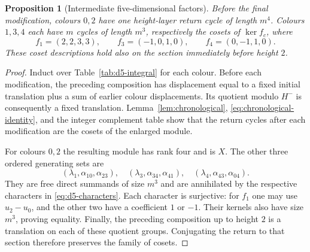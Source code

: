\documentclass[11pt,reqno]{amsart}
\numberwithin{equation}{section}
\newtheorem{proposition}[theorem]{Proposition}
\theoremstyle{definition}
\theoremstyle{remark}
\begin{document}
\begin{proposition}[Intermediate five-dimensional factors]\label{prop:d5-preterminal}
Before the final modification, colours $0,2$ have one height-layer return cycle of
length $m^4$. Colours $1,3,4$ each have $m$ cycles of length $m^3$, respectively
the cosets of $\ker f_c$, where
\begin{equation}\label{eq:d5-characters}
 f_1=(2,2,3,3),\qquad f_3=(-1,0,1,0),\qquad f_4=(0,-1,1,0).
\end{equation}
These coset descriptions hold also on the section immediately before height $2$.
\end{proposition}
\begin{proof}
Induct over Table~\ref{tab:d5-integral} for each colour. Before each
modification, the preceding composition has displacement equal to a fixed
initial translation plus a sum of earlier colour displacements. Its quotient modulo
$H^-$ is consequently a fixed translation. Lemma~\ref{lem:chronological},
\eqref{eq:chronological-identity}, and the integer complement table show that the
return cycles after each modification are the cosets of the enlarged
module.

For colours $0,2$ the resulting module has rank four and is $X$. The other three
ordered generating sets are
\[
 (\lambda_1,\alpha_{10},\alpha_{23}),\quad
 (\lambda_3,\alpha_{34},\alpha_{41}),\quad
 (\lambda_4,\alpha_{43},\alpha_{04}).
\]
They are free direct summands of size $m^3$ and are annihilated by the respective
characters in \eqref{eq:d5-characters}. Each character is surjective: for $f_1$
one may use $u_2-u_0$, and the other two have a coefficient $1$ or $-1$.
Their kernels also have size $m^3$, proving equality. Finally, the preceding composition up to
height $2$ is a translation on each of these quotient groups. Conjugating the
return to that section therefore preserves the family of cosets.
\end{proof}
\end{document}
